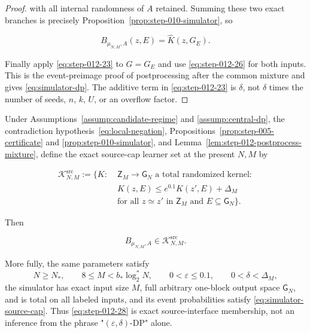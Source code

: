 \begin{proof}
with all internal randomness of \(A\) retained.  Summing these two exact
branches is precisely Proposition~\ref{prop:step-010-simulator},
so

\[
  B_{\mu_{N,M},A}(z,E)=\widehat K(z,G_E).
\tag{S12.26}\label{eq:step-012-26}
\]

Finally apply \eqref{eq:step-012-23} to \(G=G_E\) and use \eqref{eq:step-012-26} for both inputs.  This is the
event-preimage proof of postprocessing after the common mixture and gives
\eqref{eq:simulator-dp}.  The additive term in \eqref{eq:step-012-23} is \(\delta\), not \(\delta\) times the
number of seeds, \(n\), \(k\), \(U\), or an overflow factor. \end{proof}

\begin{proposition}\label{prop:step-012-source-membership}
Under Assumptions~\ref{assump:candidate-regime} and
\ref{assump:central-dp}, the contradiction hypothesis~\eqref{eq:local-negation}, Propositions~\ref{prop:step-005-certificate} and
\ref{prop:step-010-simulator}, and
Lemma~\ref{lem:step-012-postprocess-mixture}, define the exact source-cap
learner set at the present \(N,M\) by

\[
\begin{aligned}
  \mathcal K^{\mathrm{src}}_{N,M}:=
  \bigl\{K:\;&\mathsf Z_M\longrightarrow\mathsf G_N
      \text{ a total randomized kernel}:\\[-1mm]
    &K(z,E)\le e^{0.1}K(z',E)+\Delta_M\\[-1mm]
    &\text{for all }z\simeq z'\text{ in }\mathsf Z_M
      \text{ and }E\subseteq\mathsf G_N\bigr\}.
\end{aligned}
\tag{S12.27}\label{eq:step-012-27}
\]

Then

\[
  B_{\mu_{N,M},A}\in\mathcal K^{\mathrm{src}}_{N,M}.
\tag{S12.28}\label{eq:step-012-28}
\]

More fully, the same parameters satisfy
\[
N\ge N_*,\qquad 8\le M<b_*\log_2^*N,\qquad
0<\varepsilon\le0.1,\qquad 0<\delta<\Delta_M,
\]
the simulator has exact input size \(M\), full arbitrary one-block
output space \(\mathsf G_N\), and is total on all labeled inputs, and its
event probabilities satisfy \eqref{eq:simulator-source-cap}.  Thus \eqref{eq:step-012-28} is exact source-interface
membership, not an inference from the phrase
"\((\varepsilon,\delta)\)-DP" alone.
\end{proposition}

